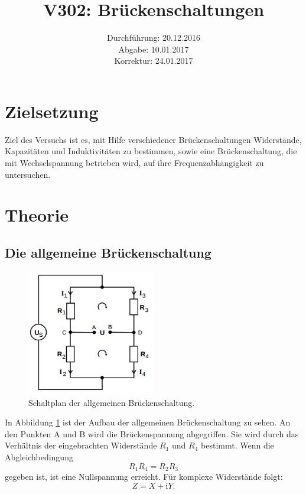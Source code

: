 \documentclass[
  bibliography=totoc,     %
  captions=tableheading,  %
  titlepage=firstiscover, %
]{scrartcl}
\title{V302: Brückenschaltungen}
\author{
  Simon Schulte
  \texorpdfstring{
    \\
    \href{mailto:simon.schulte@udo.edu}{simon.schulte@udo.edu}
  }{}
  \texorpdfstring{\and}{, }
  Tim Sedlaczek
  \texorpdfstring{
    \\
    \href{mailto:tim.sedlaczek@udo.edu}{tim.sedlaczek@udo.edu}
  }{}
}
\date{Durchführung: 20.12.2016\\
      Abgabe: 10.01.2017\\
      Korrektur: 24.01.2017}
\begin{document}
\maketitle
\thispagestyle{empty}
\tableofcontents
\newpage
\section{Zielsetzung}
\label{sec:zielsetzung}
Ziel des Versuchs ist es, mit Hilfe verschiedener Brückenschaltungen Widerstände,
Kapazitäten und Induktivitäten zu bestimmen, sowie eine Brückenschaltung, die
mit Wechselspannung betrieben wird, auf ihre Frequenzabhängigkeit zu untersuchen.
\section{Theorie}
\label{sec:theorie}
\subsection{Die allgemeine Brückenschaltung}
\label{sec:allgemeinebrückenschaltung}
\begin{figure}[htb]
  \centering
  \includegraphics[width=0.5\textwidth]{V3021.png}
  \caption{Schaltplan der allgemeinen Brückenschaltung. \cite{anleitung}}
  \label{fig:V3021}
\end{figure}
In Abbildung \ref{fig:V3021} ist der Aufbau der allgemeinen
Brückenschaltung zu sehen. An den Punkten A und B wird die Brückenspannung abgegriffen.
Sie wird durch das Verhältnis der eingebrachten Widerstände $R_1$ und $R_4$
bestimmt.
Wenn die Abgleichbedingung
\begin{equation}
    R_1 R_4 = R_2 R_3
    \label{eqn:abgleich}
\end{equation}
gegeben ist, ist eine Nullspannung erreicht. Für komplexe Widerstände folgt:
\begin{equation}
    Z = X + \mathup{i}Y.
\end{equation}
\end{document}

